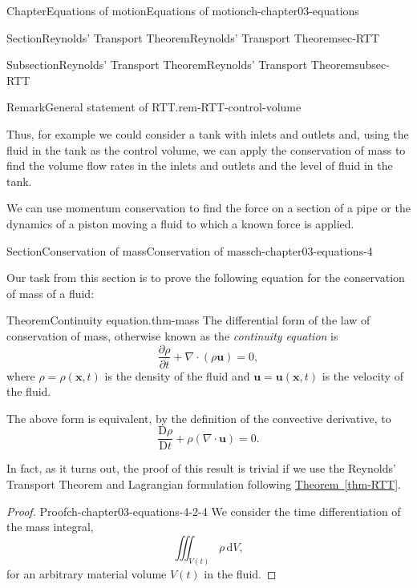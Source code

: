 \documentclass[oneside,10pt,]{book}
\newcommand{\xreffont}{\relax}
\numberwithin{equation}{section}
\newcommand{\de}{\mathrm{d}}
\newcommand{\DD}[2]{\frac{\mathrm{D}#1}{\mathrm{D}#2}}
\newcommand{\pd}[2]{\frac{\partial#1}{\partial#2}}
\newcommand{\bx}{\boldsymbol{x}}
\newcommand{\bu}{\boldsymbol{u}}
\begin{document}
\begin{chapterptx}{Chapter}{Equations of motion}{}{Equations of motion}{}{}{ch-chapter03-equations}
\begin{sectionptx}{Section}{Reynolds' Transport Theorem}{}{Reynolds' Transport Theorem}{}{}{sec-RTT}
\begin{subsectionptx}{Subsection}{Reynolds' Transport Theorem}{}{Reynolds' Transport Theorem}{}{}{subsec-RTT}
\begin{remark}{Remark}{General statement of RTT.}{rem-RTT-control-volume}
\par
Thus, for example we could consider a tank with inlets and outlets and, using the fluid in the tank as the control volume, we can apply the conservation of mass to find the volume flow rates in the inlets and outlets and the level of fluid in the tank.%
\par
We can use momentum conservation to find the force on a section of a pipe or the dynamics of a piston moving a fluid to which a known force is applied.%
\end{remark}
\end{subsectionptx}
\end{sectionptx}
%
%
\typeout{************************************************}
\typeout{************************************************}
%
\begin{sectionptx}{Section}{Conservation of mass}{}{Conservation of mass}{}{}{ch-chapter03-equations-4}
\begin{introduction}{}%
Our task from this section is to prove the following equation for the conservation of mass of a fluid:%
\begin{theorem}{Theorem}{Continuity equation.}{}{thm-mass}%
The differential form of the law of conservation of mass, otherwise known as the \emph{continuity equation} is%
\begin{equation}
\pd{\rho}{t} + \nabla \cdot (\rho \bu) = 0,\label{eqn-consvmass1}
\end{equation}
where \(\rho = \rho(\bx,t)\) is the density of the fluid and \(\bu = \bu(\bx, t)\) is the velocity of the fluid.%
\par
The above form is equivalent, by the definition of the convective derivative, to%
\begin{equation}
\DD{\rho}{t} + \rho(\nabla \cdot \bu) = 0. \label{eqn-consvmass2}
\end{equation}
%
\end{theorem}
In fact, as it turns out, the proof of this result is trivial if we use the Reynolds' Transport Theorem and Lagrangian formulation following \hyperref[thm-RTT]{Theorem~{\xreffont\ref{thm-RTT}}}.%
\begin{proof}{Proof}{}{ch-chapter03-equations-4-2-4}
We consider the time differentiation of the mass integral,%
\begin{equation*}
\iiint_{V(t)} \rho \, \de{V},
\end{equation*}
for an arbitrary material volume \(V(t)\) in the fluid.%
\par

\end{proof}
\end{introduction}
\end{sectionptx}
\end{chapterptx}
\end{document}
